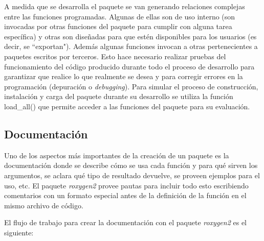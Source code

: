 A medida que se desarrolla el paquete se van generando relaciones complejas entre las funciones programadas. Algunas de ellas son de uso interno (son invocadas por otras funciones del paquete para cumplir con alguna tarea específica) y otras son diseñadas para que estén disponibles para los usuarios (es decir, se ``exportan"). Además algunas funciones invocan a otras pertenecientes a paquetes escritos por terceros. Esto hace necesario realizar pruebas del funcionamiento del código  producido durante todo el proceso de desarrollo para garantizar que realice lo que realmente se desea y para corregir errores en la programación (depuración o \emph{debugging}). Para simular el proceso de construcción, instalación y carga del paquete durante su desarrollo se utiliza la función 
\textcolor{fandango}{load\_all()} que permite acceder a las funciones del paquete para su evaluación.


\subsection{Documentación}

Uno de los aspectos más importantes de la creación de un paquete es la documentación donde se describe cómo se usa cada función y para qué sirven los argumentos, se aclara qué tipo de resultado devuelve, se proveen ejemplos para el uso, etc. El paquete \emph{roxygen2} provee pautas para incluir todo esto escribiendo comentarios con un formato especial antes de la definición de la función en el mismo archivo de código. 

El flujo de trabajo para crear la documentación con el paquete \emph{roxygen2} es el siguiente:

